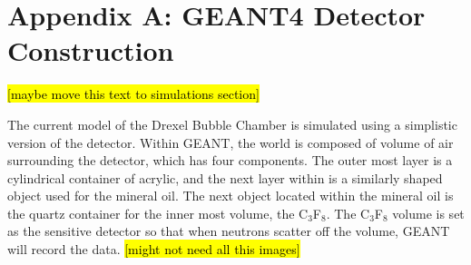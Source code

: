 \documentclass[%
12pt,
twoside,
reprint,
amsmath,amssymb,
aps,
]{article}
\begin{document}
	\section*{Appendix A: GEANT4 Detector Construction}
	\hl{[maybe move this text to simulations section]}
	\par The current model of the Drexel Bubble Chamber is simulated using a simplistic version of the detector. Within GEANT, the world is composed of volume of air surrounding the detector, which has four components. The outer most layer is a cylindrical container of acrylic, and the next layer within is a similarly shaped object used for the mineral oil. The next object located within the mineral oil is the quartz container for the inner most volume, the C$_{3}$F$_{8}$. The C$_{3}$F$_{8}$ volume is set as the sensitive detector so that when neutrons scatter off the volume, GEANT will record the data.
	\hl{[might not need all this images]}
\end{document}
